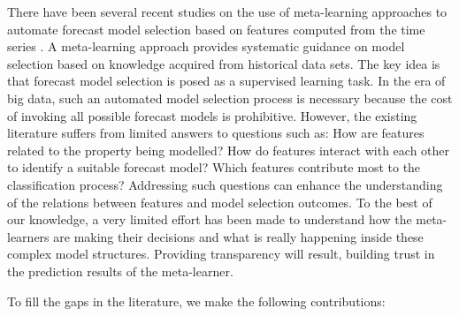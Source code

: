 \documentclass[11pt,a4paper,]{article}
\begin{document}
There have been several recent studies on the use of meta-learning approaches to automate forecast model selection based on features computed from the time series \autocites{shah1997model}{prudencio2004meta}{lemke2010meta}{kuck2016meta}. A meta-learning approach provides systematic guidance on model selection based on knowledge acquired from historical data sets. The key idea is that forecast model selection is posed as a supervised learning task. In the era of big data, such an automated model selection process is necessary because the cost of invoking all possible forecast models is prohibitive. However, the existing literature suffers from limited answers to questions such as: How are features related to the property being modelled? How do features interact with each other to identify a suitable forecast model? Which features contribute most to the classification process? Addressing such questions can enhance the understanding of the relations between features and model selection outcomes. To the best of our knowledge, a very limited effort has been made to understand how the meta-learners are making their decisions and what is really happening inside these complex model structures. Providing transparency will result, building trust in the prediction results of the meta-learner.

To fill the gaps in the literature, we make the following contributions:
\end{document}
